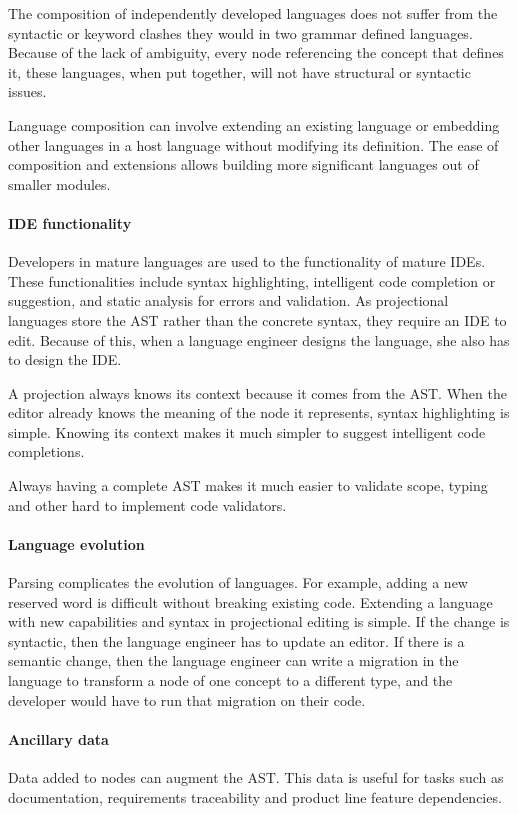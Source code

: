 The composition of independently developed languages does not suffer from the syntactic or keyword clashes they would in two grammar defined languages.
Because of the lack of ambiguity, every node referencing the concept that defines it, these languages, when put together, will not have structural or syntactic issues.

Language composition can involve extending an existing language or embedding other languages in a host language without modifying its definition.
The ease of composition and extensions allows building more significant languages out of smaller modules.

\paragraph{IDE functionality}
Developers in mature languages are used to the functionality of mature IDEs.
These functionalities include syntax highlighting, intelligent code completion or suggestion, and static analysis for errors and validation.
As projectional languages store the AST rather than the concrete syntax, they require an IDE to edit.
Because of this, when a language engineer designs the language, she also has to design the IDE.

A projection always knows its context because it comes from the AST.
When the editor already knows the meaning of the node it represents, syntax highlighting is simple.
Knowing its context makes it much simpler to suggest intelligent code completions.

Always having a complete AST makes it much easier to validate scope, typing and other hard to implement code validators.

\paragraph{Language evolution}
Parsing complicates the evolution of languages. 
For example, adding a new reserved word is difficult without breaking existing code.
Extending a language with new capabilities and syntax in projectional editing is simple.
If the change is syntactic, then the language engineer has to update an editor.
If there is a semantic change, then the language engineer can write a migration in the language to transform a node of one concept to a different type, and the developer would have to run that migration on their code.

\paragraph{Ancillary data}
Data added to nodes can augment the AST.
This data is useful for tasks such as documentation, requirements traceability and product line feature dependencies.

